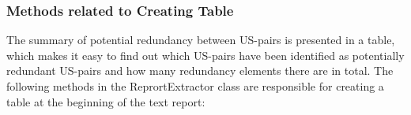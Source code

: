 \subsubsection*{Methods related to Creating Table}
The summary of potential redundancy between US-pairs is presented in a table, which makes it easy to find out which US-pairs have been identified as potentially redundant US-pairs and how many redundancy elements there are in total.
The following methods in the ReprortExtractor class are responsible for creating a table at the beginning of the text report:

